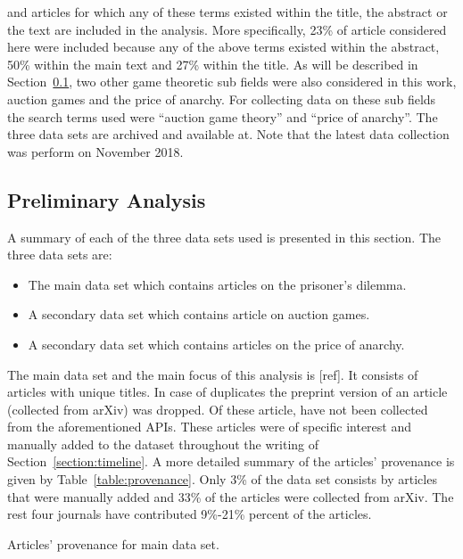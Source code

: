 \documentclass{article}
\theoremstyle{definition}
\newcommand{\totalarticles}{}
\newcommand{\manual}{}
\begin{document}
and articles for which any of these terms existed within the title, the abstract
or the text are included in the analysis. More specifically, 23\% of article
considered here were included because any of the above terms existed within
the abstract, 50\% within the main text and 27\% within the title.
As will be described in Section~\ref{section:preliminary_analysis}, two other
game theoretic sub fields were also considered in this work, auction games and the
price of anarchy. For collecting data on these sub fields the search terms used
were ``auction game theory'' and ``price of anarchy''. The three data sets
are archived and available at. %
Note that the latest data collection was perform on November
2018.%

\subsection{Preliminary Analysis}\label{section:preliminary_analysis}

A summary of each of the three data sets used is presented in this section.
The three data sets are:

\begin{itemize}
    \item The main data set which contains articles on the prisoner's dilemma.
    \item A secondary data set which contains article on auction games.
    \item A secondary data set which contains articles on the price of anarchy.
\end{itemize}

The main data set and the main focus of this analysis is [ref]. It
consists of \totalarticles articles with unique titles. In case of duplicates
the preprint version of an article (collected from arXiv) was dropped.
Of these \totalarticles article, \manual have not been collected from the
aforementioned APIs. These articles were of specific interest and manually added
to the dataset throughout the writing of Section~\ref{section:timeline}. A more
detailed summary of the articles' provenance is given by Table~\ref{table:provenance}.
Only 3\% of the data set consists by articles that were manually added and 33\% of the
articles were collected from arXiv. The rest four journals have contributed 9\%-21\%
percent of the articles.

\begin{table}[!hbtp]
    \begin{center}
    
    \end{center}
    \caption{Articles' provenance for main data set.} %
    \label{table:provenance}
\end{table}
\end{document}
